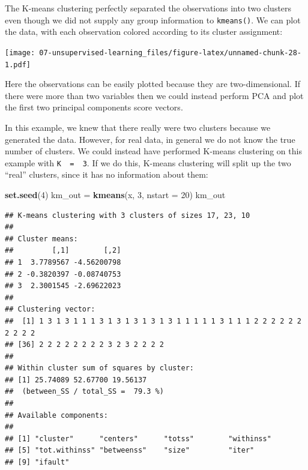 \documentclass[openany]{book}
\newenvironment{Shaded}{\begin{snugshade}}{\end{snugshade}}
\newcommand{\DataTypeTok}[1]{\textcolor[rgb]{0.13,0.29,0.53}{#1}}
\newcommand{\DecValTok}[1]{\textcolor[rgb]{0.00,0.00,0.81}{#1}}
\newcommand{\KeywordTok}[1]{\textcolor[rgb]{0.13,0.29,0.53}{\textbf{#1}}}
\newcommand{\NormalTok}[1]{#1}
\newcommand{\OperatorTok}[1]{\textcolor[rgb]{0.81,0.36,0.00}{\textbf{#1}}}
\newcommand{\StringTok}[1]{\textcolor[rgb]{0.31,0.60,0.02}{#1}}
\begin{document}
The K-means clustering perfectly separated the observations into two clusters
even though we did not supply any group information to \texttt{kmeans()}. We
can plot the data, with each observation colored according to its cluster
assignment:

\begin{Shaded}
\end{Shaded}

\texttt{[image: 07-unsupervised-learning\_files/figure-latex/unnamed-chunk-28-1.pdf]}

Here the observations can be easily plotted because they are two-dimensional.
If there were more than two variables then we could instead perform PCA
and plot the first two principal components score vectors.

In this example, we knew that there really were two clusters because
we generated the data. However, for real data, in general we do not know
the true number of clusters. We could instead have performed K-means
clustering on this example with \texttt{K\ \ =\ \ 3}. If we do this, K-means clustering will split up the two ``real'' clusters, since it has no information about them:

\begin{Shaded}
\begin{Highlighting}[]
\KeywordTok{set.seed}\NormalTok{(}\DecValTok{4}\NormalTok{)}
\NormalTok{km_out =}\StringTok{ }\KeywordTok{kmeans}\NormalTok{(x, }\DecValTok{3}\NormalTok{, }\DataTypeTok{nstart =} \DecValTok{20}\NormalTok{)}
\NormalTok{km_out}
\end{Highlighting}
\end{Shaded}

\begin{verbatim}
## K-means clustering with 3 clusters of sizes 17, 23, 10
## 
## Cluster means:
##         [,1]        [,2]
## 1  3.7789567 -4.56200798
## 2 -0.3820397 -0.08740753
## 3  2.3001545 -2.69622023
## 
## Clustering vector:
##  [1] 1 3 1 3 1 1 1 3 1 3 1 3 1 3 1 3 1 1 1 1 1 3 1 1 1 2 2 2 2 2 2 2 2 2 2
## [36] 2 2 2 2 2 2 2 2 3 2 3 2 2 2 2
## 
## Within cluster sum of squares by cluster:
## [1] 25.74089 52.67700 19.56137
##  (between_SS / total_SS =  79.3 %)
## 
## Available components:
## 
## [1] "cluster"      "centers"      "totss"        "withinss"    
## [5] "tot.withinss" "betweenss"    "size"         "iter"        
## [9] "ifault"
\end{verbatim}
\end{document}
